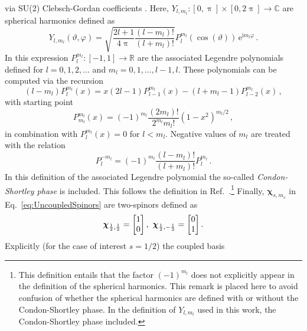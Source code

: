 \documentclass[fontsize=12pt,
               twoside=false,
               BCOR=0mm,
               DIV=14,
               overfullrule=false, %
               toc=bibliography,
               headinclude=true,
               footinclude=false]{scrartcl}
\numberwithin{equation}{section}
\newcommand{\ee}{\mathrm{e}}
\newcommand{\ii}{\mathrm{i}}
\newcommand{\pii}{\uppi}
\begin{document}
    via SU(2) Clebsch-Gordan coefficients \cite{friedrich2017}. Here,
    $Y_{l,m_l}\colon[0,\pii]\times[0,2\pii]\to\mathbb{C}$ are spherical
    harmonics defined as
    \begin{equation}\label{eq:SphericalHarmonics}
        Y_{l,m_l}(\vartheta,\varphi)
        =
        \sqrt{\frac{2l+1}{4\pii}\frac{(l-m_l)!}{(l+m_l)!}}
        P^{m_l}_l(\cos(\vartheta))\,\ee^{\ii m_l \varphi}
    \,.
    \end{equation}
    In this expression $P^{m_l}_l\colon[-1,1]\to\mathbb{R}$ are the associated
    Legendre polynomials defined for $l=0,1,2,\dots$ and $m_l=0,1,\dots,l-1,l$.
    These polynomials can be computed via the recursion
    \begin{equation}
        (l-m_l) P^{m_l}_l(x)
        =
        x (2l-1) P^{m_l}_{l-1}(x)
        -
        (l+m_l-1) P^{m_l}_{l-2}(x)
    \,,
    \end{equation}
    with starting point
    \begin{equation}
        P^{m_l}_{m_l}(x)
        =
        (-1)^{m_l}\frac{(2m_l)!}{2^{m_l}m_l!} (1-x^2)^{m_l\slash{2}}
    \,,
    \end{equation}
    in combination with $P^{m_l}_l(x)=0$ for $l<m_l$. Negative values of $m_l$
    are treated with the relation
    \begin{equation}
        P^{-m_l}_l = (-1)^{m_l} \frac{(l-m_l)!}{(l+m_l)!}P^{m_l}_l
    \,.
    \end{equation}
    In this definition of the associated Legendre polynomial the so-called
    \emph{Condon-Shortley phase} is included. This follows the definition in
    Ref.~\cite{friedrich2017}.\footnote{This definition entails that the factor
    $(-1)^{m_l}$ does not explicitly appear in the definition of the spherical
    harmonics. This remark is placed here to avoid confusion of whether the
    spherical harmonics are defined with or without the Condon-Shortley phase.
    In the definition of $Y_{l,m_l}$ used in this work, the Condon-Shortley
    phase included.} Finally, $\bm{\chi}_{s,m_s}$ in
    Eq.~\eqref{eq:UncoupledSpinors} are two-spinors defined as
    \begin{equation}\label{eq:TwoSpinors}
        \bm{\chi}_{\frac{1}{2},\frac{1}{2}}=\mqty[1 \\ 0]
    \,, \
        \bm{\chi}_{\frac{1}{2},-\frac{1}{2}}=\mqty[0 \\ 1]
    \,.
    \end{equation}
    Explicitly (for the case of interest $s=1\slash{2}$) the coupled basis
\end{document}
